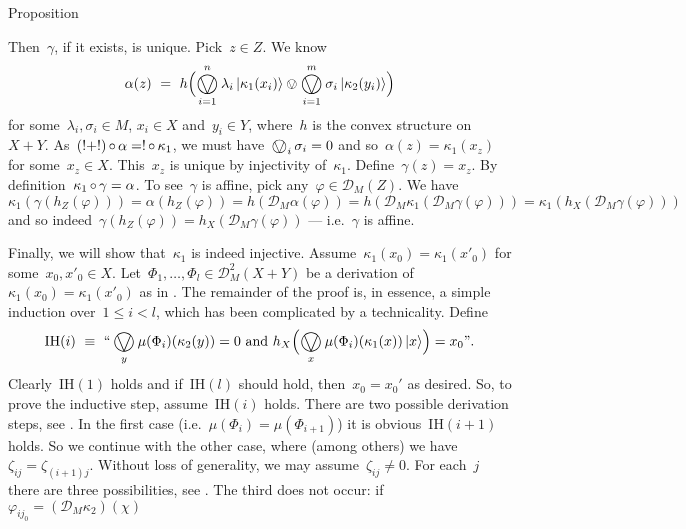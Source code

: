 \documentclass[b]{subfiles}
\begin{document}
\begin{parsec}
\begin{point}[aconvalmosteffectus]{Proposition}
\begin{point}
Then~$\gamma$, if it exists, is unique.
Pick~$z \in Z$.
We know
\begin{equation*}
    \alpha(z) \ =\  h 
    \Bigl( \bigovee^n_{i=1} \lambda_i \ket{\kappa_1(x_i)}
    \ovee \bigovee^m_{i=1} \sigma_i \ket{\kappa_2(y_i)} \Bigr)
\end{equation*}
for some~$\lambda_i,\sigma_i \in M $, 
$x_i \in X$ and~$y_i \in Y$,
where~$h$ is the convex structure on~$X+Y$.
As~$(!+!) \mathop{\circ} \alpha = ! \mathop{\circ} \kappa_1$,
    we must have~$\bigovee_i \sigma_i = 0$
    and so~$\alpha(z) = \kappa_1(x_z)$
    for some~$x_z \in X$.
This~$x_z$ is unique by injectivity of~$\kappa_1$.
    Define~$\gamma(z) = x_z$.
By definition~$\kappa_1 \mathop{\circ} \gamma = \alpha$.
To see~$\gamma$ is affine, pick any~$\varphi \in \mathcal{D}_M (Z)$.
We have
$
\kappa_1 ( \gamma ( h_Z (\varphi )))
    = \alpha(h_Z (\varphi))
    = h(\mathcal{D}_M\alpha(\varphi))
    = h(\mathcal{D}_M\kappa_1 ( \mathcal{D}_M \gamma(\varphi)))
    = \kappa_1  (h_X( \mathcal{D}_M \gamma(\varphi)))
$ and
so indeed~$\gamma(h_Z(\varphi)) = h_X(\mathcal{D}_M \gamma (\varphi))$
    --- i.e.~$\gamma$ is affine.
\end{point}
\begin{point}%
Finally, we will show that~$\kappa_1$ is indeed injective.
Assume~$\kappa_1(x_0) = \kappa_1(x'_0)$
for some~$x_0,x'_0 \in X$.
    Let~$\Phi_1, \ldots, \Phi_l \in \mathcal{D}_M^2{(X+Y)}$
    be a derivation
    of~$\kappa_1(x_0) = \kappa_1(x'_0)$
    as in .
The remainder of the proof is, in essence, a simple induction
    over~$1 \leq i < l$, which has been complicated
    by a technicality.
Define
\begin{equation*}
    \mathrm{IH}(i) \ \equiv \ \text{``}
    \bigovee_y \mu(\Phi_i)(\kappa_2 (y)) = 0
        \text{ and }
        h_X\Bigl(\bigovee_{x} \mu(\Phi_i)(\kappa_1(x)) \ket{x}\Bigr)
        =    x_0 \text{''}.
\end{equation*}
Clearly~$\mathrm{IH}(1)$ holds
    and if~$\mathrm{IH}(l)$ should hold,
    then~$x_0 = x_0'$ as desired.
So, to prove the inductive step, assume~$\mathrm{IH}(i)$ holds.
There are two possible derivation steps, see .
In the first case (i.e.~$\mu(\Phi_i) = \mu(\Phi_{i+1})$)
    it is obvious~$\mathrm{IH}(i+1)$ holds.
So we continue with the other case,
where (among others) we have~$\zeta_{ij} = \zeta_{(i+1)j}$.
Without loss of generality, we may assume~$\zeta_{ij} \neq 0$.
For each~$j$ there are three possibilities, see .
The third does not occur:
if~$\varphi_{ij_0} = (\mathcal{D}_M \kappa_2) (\chi)$

\end{point}
\end{point}
\end{parsec}
\end{document}
